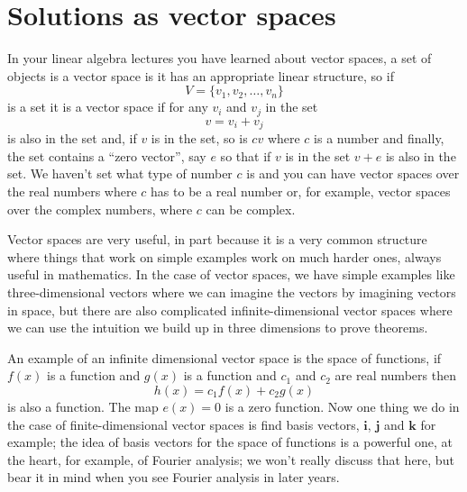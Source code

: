 \documentclass[12pt]{article}
\begin{document}
\section*{Solutions as vector spaces}

In your linear algebra lectures you have learned about vector spaces, a set of objects is a vector space is it has an appropriate linear structure, so if
\begin{equation}
  V=\{v_1,v_2,\ldots,v_n\}
\end{equation}
is a set it is a vector space if for any $v_i$ and $v_j$ in the set
\begin{equation}
  v=v_i+v_j
\end{equation}
is also in the set and, if $v$ is in the set, so is $cv$ where $c$ is
a number and finally, the set contains a ``zero vector'', say $e$ so
that if $v$ is in the set $v+e$ is also in the set. We haven't set
what type of number $c$ is and you can have vector spaces over the
real numbers where $c$ has to be a real number or, for example, vector
spaces over the complex numbers, where $c$ can be complex.

Vector spaces are very useful, in part because it is a very common
structure where things that work on simple examples work on much
harder ones, always useful in mathematics. In the case of vector
spaces, we have simple examples like three-dimensional vectors where
we can imagine the vectors by imagining vectors in space, but there
are also complicated infinite-dimensional vector spaces where we can
use the intuition we build up in three dimensions to prove theorems.

An example of an infinite dimensional vector space is the space of
functions, if $f(x)$ is a function and $g(x)$ is a function and $c_1$
and $c_2$ are real numbers then
\begin{equation}
  h(x)=c_1f(x)+c_2g(x)
\end{equation}
is also a function. The map $e(x)=0$ is a zero function. Now one thing
we do in the case of finite-dimensional vector spaces is find basis
vectors, $\textbf{i}$, $\textbf{j}$ and $\textbf{k}$ for example; the
idea of basis vectors for the space of functions is a powerful one, at
the heart, for example, of Fourier analysis; we won't really discuss
that here, but bear it in mind when you see Fourier analysis in later
years.
\end{document}
